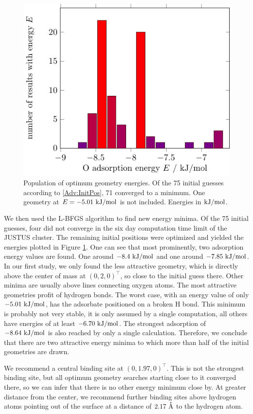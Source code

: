 \begin{figure}[t!]
\centering
\includegraphics[width=.7\textwidth]{./TikzPics/TikzCreation/BindingEnergyDistribution/BindingEnergyDistribution.pdf}
\caption{Population of optimum geometry energies. Of the 75 initial guesses
according to \eqref{Adv:InitPos}, 71 converged to a minimum. One
geometry at $E=-5.01~\text {kJ/mol}$ is not included. Energies in $\text {kJ/mol}$.}
\label{Fig:Adv:BindingSitesEnergies}
\end{figure}

We then used the L-BFGS algorithm to find new energy minima. Of the 75
initial guesses, four did not converge in the six day computation time limit
of the JUSTUS cluster. The remaining initial positions were optimized
and yielded the energies plotted in Figure \ref{Fig:Adv:BindingSitesEnergies}.
One can see that most prominently, two adsorption energy values are found. One
around $-8.4~\text {kJ/mol}$ and one around $-7.85~\text {kJ/mol}$. In our first study, we only
found the less attractive geometry, which is directly above the center of mass
at $(0,2,0)^\intercal$, so close to the initial guess there. Other minima are
usually above lines connecting oxygen atoms. The most attractive geometries
profit of hydrogen bonds. The worst case, with an energy value of only
$-5.01~\text {kJ/mol}$, has the adsorbate positioned on a broken H bond. This minimum is
probably not very stable, it is only assumed by a single computation, all
others have energies of at least $-6.70~\text {kJ/mol}$. The strongest adsorption of
$-8.64~\text {kJ/mol}$ is also reached by only a single calculation. Therefore, we
conclude that there are two attractive energy minima to which more
than half of the initial geometries are drawn.

We recommend a central binding site at $(0,1.97,0)^\intercal$. This is not the
strongest binding site, but all optimum geometry searches starting close to it
converged there, so we can infer that there is no other energy minimum close by.
At greater distance from the center, we recommend further binding sites above
hydrogen atoms pointing out of the surface at a distance of $2.17~\mathring{\text{A}}$ to the
hydrogen atom.

